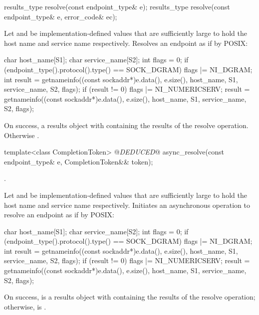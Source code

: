 \begin{itemdecl}
results_type resolve(const endpoint_type& e);
results_type resolve(const endpoint_type& e, error_code& ec);
\end{itemdecl}

\begin{itemdescr}
\pnum
\effects Let  and  be implementation-defined values that are sufficiently large to hold the host name and service name respectively. Resolves an endpoint as if by POSIX: 
\begin{codeblock}
char host_name[S1];
char service_name[S2];
int flags = 0;
if (endpoint_type().protocol().type() == SOCK_DGRAM)
  flags |= NI_DGRAM;
int result = getnameinfo((const sockaddr*)e.data(), e.size(),
                         host_name, S1,
                         service_name, S2,
                         flags);
if (result != 0)
{
  flags |= NI_NUMERICSERV;
  result = getnameinfo((const sockaddr*)e.data(), e.size(),
                       host_name, S1,
                       service_name, S2,
                       flags);
}
\end{codeblock}


\pnum
\returns On success, a results object with  containing the results of the resolve operation. Otherwise .
\end{itemdescr}

\begin{itemdecl}
template<class CompletionToken>
  @\textit{DEDUCED}@ async_resolve(const endpoint_type& e,
                        CompletionToken&& token);
\end{itemdecl}

\begin{itemdescr}
\pnum
\completionsig {}.

\pnum
\effects Let  and  be implementation-defined values that are sufficiently large to hold the host name and service name respectively. Initiates an asynchronous operation to resolve an endpoint as if by POSIX: 
\begin{codeblock}
char host_name[S1];
char service_name[S2];
int flags = 0;
if (endpoint_type().protocol().type() == SOCK_DGRAM)
  flags |= NI_DGRAM;
int result = getnameinfo((const sockaddr*)e.data(), e.size(),
                         host_name, S1,
                         service_name, S2,
                         flags);
if (result != 0)
{
  flags |= NI_NUMERICSERV;
  result = getnameinfo((const sockaddr*)e.data(), e.size(),
                       host_name, S1,
                       service_name, S2,
                       flags);
}
\end{codeblock}
 On success,  is a results object with  containing the results of the resolve operation; otherwise,  is .
\end{itemdescr}




